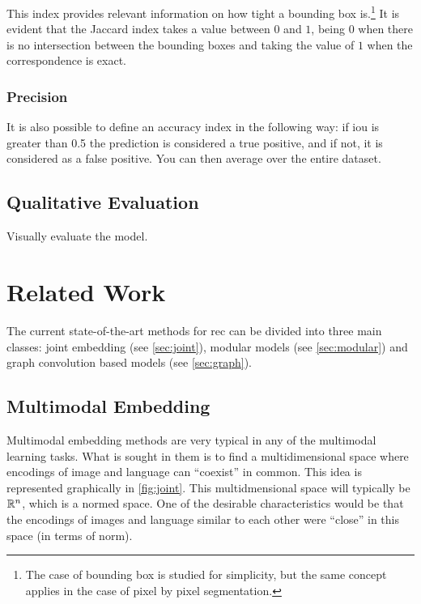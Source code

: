This index provides relevant information on how tight a bounding box
is.\footnote{The case of bounding box is studied for simplicity, but the same
  concept applies in the case of pixel by pixel segmentation.} It is evident
that the Jaccard index takes a value between \(0\) and \(1\), being \(0\) when
there is no intersection between the bounding boxes and taking the value of
\(1\) when the correspondence is exact.

\subsubsection{Precision}

It is also possible to define an accuracy index in the following way: if
\gls{iou} is greater than \num{0.5} the prediction is considered a true
positive, and if not, it is considered as a false positive. You can then
average over the entire dataset.


\subsection{Qualitative Evaluation}\label{sec:qualitative-eval}

Visually evaluate the model.



\section{Related Work}\label{sec:sota}

The current state-of-the-art methods for \gls{rec} can be divided into three
main classes: joint embedding (see \vref{sec:joint}), modular models (see
\vref{sec:modular}) and graph convolution based models (see \vref{sec:graph}).


\subsection{Multimodal Embedding}%
\label{sec:joint}

Multimodal embedding methods are very typical in any of the multimodal learning
tasks. What is sought in them is to find a multidimensional space where
encodings of image and language can ``coexist'' in common. This idea is
represented graphically in \vref{fig:joint}. This multidmensional space will
typically be \(\mathbb{R}^n\), which is a normed space. One of the desirable
characteristics would be that the encodings of images and language similar to
each other were ``close'' in this space (in terms of norm).

